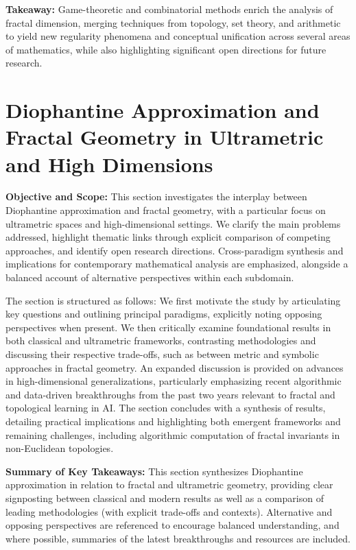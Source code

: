 \documentclass[sigconf]{acmart}
\begin{document}
\textbf{Takeaway:} Game-theoretic and combinatorial methods enrich the analysis of fractal dimension, merging techniques from topology, set theory, and arithmetic to yield new regularity phenomena and conceptual unification across several areas of mathematics, while also highlighting significant open directions for future research.

\section{Diophantine Approximation and Fractal Geometry in Ultrametric and High Dimensions}

\textbf{Objective and Scope:} This section investigates the interplay between Diophantine approximation and fractal geometry, with a particular focus on ultrametric spaces and high-dimensional settings. We clarify the main problems addressed, highlight thematic links through explicit comparison of competing approaches, and identify open research directions. Cross-paradigm synthesis and implications for contemporary mathematical analysis are emphasized, alongside a balanced account of alternative perspectives within each subdomain.

The section is structured as follows: We first motivate the study by articulating key questions and outlining principal paradigms, explicitly noting opposing perspectives when present. We then critically examine foundational results in both classical and ultrametric frameworks, contrasting methodologies and discussing their respective trade-offs, such as between metric and symbolic approaches in fractal geometry. An expanded discussion is provided on advances in high-dimensional generalizations, particularly emphasizing recent algorithmic and data-driven breakthroughs from the past two years relevant to fractal and topological learning in AI. The section concludes with a synthesis of results, detailing practical implications and highlighting both emergent frameworks and remaining challenges, including algorithmic computation of fractal invariants in non-Euclidean topologies.

\textbf{Summary of Key Takeaways:} This section synthesizes Diophantine approximation in relation to fractal and ultrametric geometry, providing clear signposting between classical and modern results as well as a comparison of leading methodologies (with explicit trade-offs and contexts). Alternative and opposing perspectives are referenced to encourage balanced understanding, and where possible, summaries of the latest breakthroughs and resources are included. 
\end{document}
